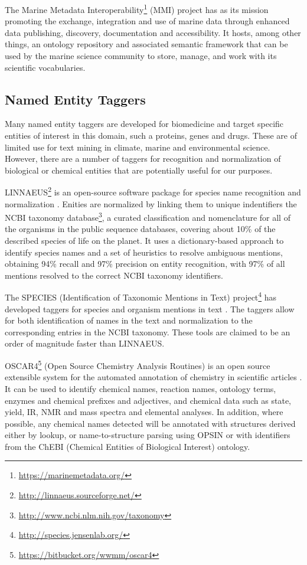 The Marine Metadata Interoperability\footnote{\url{https://marinemetadata.org/}} (MMI) project has as its mission promoting the exchange, integration and use of marine data through enhanced data publishing, discovery, documentation and accessibility.
It hosts, among other things, an ontology repository and associated semantic framework that can be used by the marine science community to store, manage, and work with its scientific vocabularies.

\subsection{Named Entity Taggers}

Many named entity taggers are developed for biomedicine and target specific entities of interest in this domain, such a proteins, genes and drugs.
These are of limited use for text mining in climate, marine and environmental science. 
However, there are a number of taggers for recognition and normalization of biological or chemical entities that are potentially useful for our purposes.

LINNAEUS\footnote{\url{http://linnaeus.sourceforge.net/}} is an open-source software package for species name recognition and normalization \citep{Gerner2010LINNAEUS}. 
Enities are normalized by linking them to unique indentifiers the NCBI taxonomy database\footnote{\url{http://www.ncbi.nlm.nih.gov/taxonomy}}, a curated classification and nomenclature for all of the organisms in the public sequence databases, covering about 10\% of the described species of life on the planet.
It uses a dictionary-based approach to identify species names and a set of heuristics to resolve ambiguous mentions, obtaining 94\% recall and 97\% precision on entity recognition, with 97\% of all mentions resolved to the correct NCBI taxonomy identifiers.
 
The SPECIES (Identification of Taxonomic Mentions in Text) project\footnote{\url{http://species.jensenlab.org/}} has developed taggers for species and organism mentions in text \citep{Pafilis2013SPECIES}. 
The taggers allow for both identification of names in the text and normalization to the corresponding entries in the NCBI taxonomy.
These tools are claimed to be an order of magnitude faster than LINNAEUS.

OSCAR4\footnote{\url{https://bitbucket.org/wwmm/oscar4}} (Open Source Chemistry Analysis Routines) is an open source extensible system for the automated annotation of chemistry in scientific articles \citep{Jessop2011OSCAR4}.
It can be used to identify chemical names, reaction names, ontology terms, enzymes and chemical prefixes and adjectives, and chemical data such as state, yield, IR, NMR and mass spectra and elemental analyses. 
In addition, where possible, any chemical names detected will be annotated with structures derived either by lookup, or name-to-structure parsing using OPSIN or with identifiers from the ChEBI (Chemical Entities of Biological Interest) ontology.

